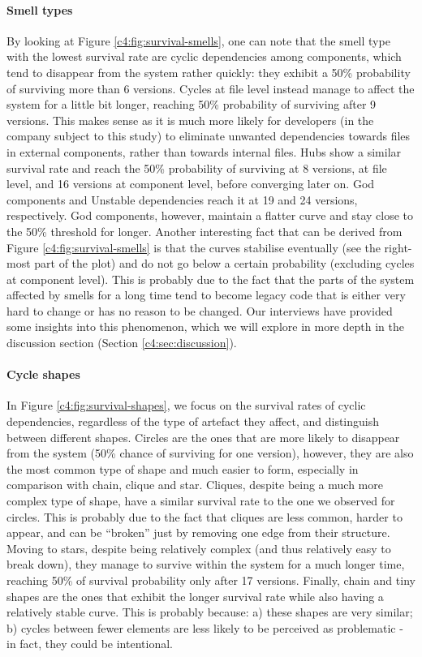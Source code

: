\paragraph{Smell types}
By looking at Figure \ref{c4:fig:survival-smells}, one can note that the smell type with the lowest survival rate are cyclic dependencies among components, which tend to disappear from the system rather quickly: they exhibit a 50\% probability of surviving more than 6 versions. 
Cycles at file level instead manage to affect the system for a little bit longer, reaching 50\% probability of surviving after 9 versions. This makes sense as it is much more likely for developers (in the company subject to this study) to eliminate unwanted dependencies towards files in external components, rather than towards internal files.
Hubs show a similar survival rate and reach the 50\% probability of surviving at 8 versions, at file level, and 16 versions at component level, before converging later on.
God components and Unstable dependencies reach it at 19 and 24 versions, respectively.
God components, however, maintain a flatter curve and stay close to the 50\% threshold for longer.
Another interesting fact that can be derived from Figure \ref{c4:fig:survival-smells} is that the curves stabilise eventually (see the right-most part of the plot) and do not go below a certain probability (excluding cycles at component level).
This is probably due to the fact that the parts of the system affected by smells for a long time tend to become legacy code that is either very hard to change or has no reason to be changed. Our interviews have provided some insights into this phenomenon, which we will explore in more depth in the discussion section (Section \ref{c4:sec:discussion}).

\paragraph{Cycle shapes}
In Figure \ref{c4:fig:survival-shapes}, we focus on the survival rates of cyclic dependencies, regardless of the type of artefact they affect, and distinguish between different shapes.
Circles are the ones that are more likely to disappear from the system (50\% chance of surviving for one version), however, they are also the most common type of shape and much easier to form, especially in comparison with chain, clique and star.
Cliques, despite being a much more complex type of shape, have a similar survival rate to the one we observed for circles.
This is probably due to the fact that cliques are less common, harder to appear, and can be ``broken'' just by removing one edge from their structure.
Moving to stars, despite being relatively complex (and thus relatively easy to break down), they manage to survive within the system for a much longer time, reaching 50\% of survival probability only after 17 versions.
Finally, chain and tiny shapes are the ones that exhibit the longer survival rate while also having a relatively stable curve.
This is probably because: a) these shapes are very similar; b) cycles between fewer elements are less likely to be perceived as problematic - in fact, they could be intentional.

